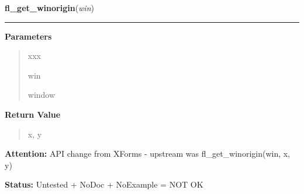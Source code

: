     \label{xformslib:library:fl_get_winorigin}

    \vspace{0.5ex}

\hspace{.8\funcindent}\begin{boxedminipage}{\funcwidth}

    \raggedright \textbf{fl\_get\_winorigin}(\textit{win})

    \vspace{-1.5ex}

    \rule{\textwidth}{0.5\fboxrule}
\setlength{\parskip}{2ex}
\setlength{\parskip}{1ex}
      \textbf{Parameters}
      \vspace{-1ex}

      \begin{quote}
        \begin{Ventry}{xxx}

          \item[win]

          window

        \end{Ventry}

      \end{quote}

      \textbf{Return Value}
    \vspace{-1ex}

      \begin{quote}
      x, y

      \end{quote}

\textbf{Attention:} API change from XForms - upstream was fl\_get\_winorigin(win, x, y)



\textbf{Status:} Untested + NoDoc + NoExample = NOT OK



    \end{boxedminipage}

    \label{xformslib:library:fl_get_wingeometry}

    \vspace{0.5ex}

